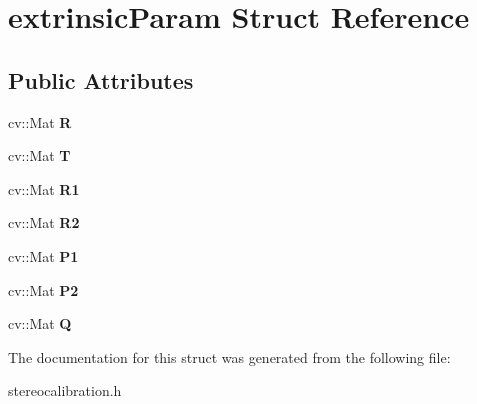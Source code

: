 \hypertarget{structextrinsic_param}{}\section{extrinsic\+Param Struct Reference}
\label{structextrinsic_param}
\subsection*{Public Attributes}
\begin{DoxyCompactItemize}
\item 
\mbox{\label{structextrinsic_param_a47acf1a4f5b7a1b7d50f0ee5ccb6125a}} 
cv\+::\+Mat {\bfseries R}
\item 
\mbox{\label{structextrinsic_param_a6c1e9334fd17381e1cdd60a709dea292}} 
cv\+::\+Mat {\bfseries T}
\item 
\mbox{\label{structextrinsic_param_aed3404a1f1b627b0eb2dc0d4d8c19714}} 
cv\+::\+Mat {\bfseries R1}
\item 
\mbox{\label{structextrinsic_param_a27babf27a3046c7fd626a4e8845daaab}} 
cv\+::\+Mat {\bfseries R2}
\item 
\mbox{\label{structextrinsic_param_aecb184d1aeb77980f5b99113fc07c9da}} 
cv\+::\+Mat {\bfseries P1}
\item 
\mbox{\label{structextrinsic_param_a63fbe65688bee05e54862081281ac1c7}} 
cv\+::\+Mat {\bfseries P2}
\item 
\mbox{\label{structextrinsic_param_a990770f2d239ccdd894ac8c68068cb74}} 
cv\+::\+Mat {\bfseries Q}
\end{DoxyCompactItemize}


The documentation for this struct was generated from the following file\+:\begin{DoxyCompactItemize}
\item 
stereocalibration.\+h\end{DoxyCompactItemize}
